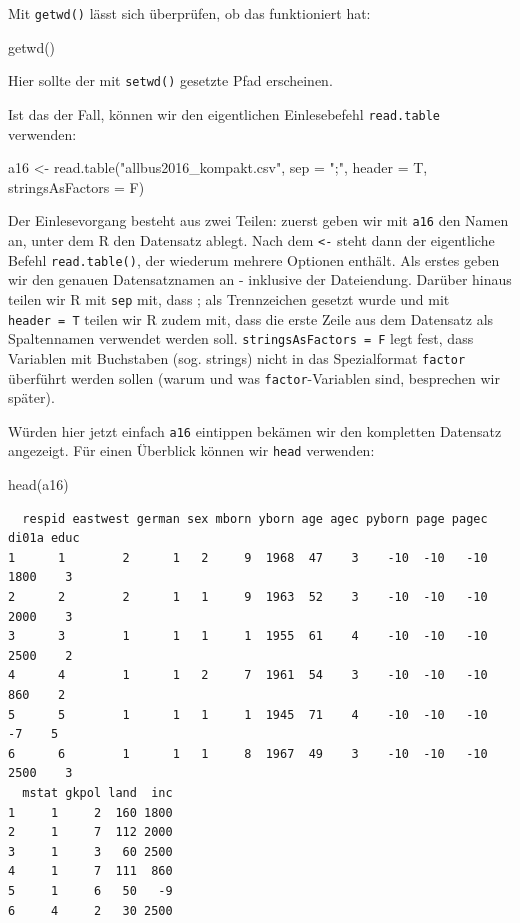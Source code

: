 \documentclass[
  letterpaper,
  DIV=11,
  numbers=noendperiod]{scrreprt}
\newenvironment{Shaded}{\begin{snugshade}}{\end{snugshade}}
\newcommand{\AttributeTok}[1]{\textcolor[rgb]{0.40,0.46,0.14}{#1}}
\newcommand{\FunctionTok}[1]{\textcolor[rgb]{0.28,0.35,0.67}{#1}}
\newcommand{\NormalTok}[1]{\textcolor[rgb]{0.00,0.46,0.62}{#1}}
\newcommand{\OtherTok}[1]{\textcolor[rgb]{0.00,0.46,0.62}{#1}}
\newcommand{\StringTok}[1]{\textcolor[rgb]{0.13,0.47,0.30}{#1}}
\begin{document}
Mit \texttt{getwd()} lässt sich überprüfen, ob das funktioniert hat:

\begin{Shaded}
\begin{Highlighting}[]
\FunctionTok{getwd}\NormalTok{()}
\end{Highlighting}
\end{Shaded}

Hier sollte der mit \texttt{setwd()} gesetzte Pfad erscheinen.

Ist das der Fall, können wir den eigentlichen Einlesebefehl
\texttt{read.table} verwenden:

\begin{Shaded}
\begin{Highlighting}[]
\NormalTok{a16 }\OtherTok{\textless{}{-}} \FunctionTok{read.table}\NormalTok{(}\StringTok{"allbus2016\_kompakt.csv"}\NormalTok{, }\AttributeTok{sep =} \StringTok{";"}\NormalTok{, }\AttributeTok{header =}\NormalTok{ T, }\AttributeTok{stringsAsFactors =}\NormalTok{ F)}
\end{Highlighting}
\end{Shaded}

Der Einlesevorgang besteht aus zwei Teilen: zuerst geben wir mit
\texttt{a16} den Namen an, unter dem R den Datensatz ablegt. Nach dem
\texttt{\textless{}-} steht dann der eigentliche Befehl
\texttt{read.table()}, der wiederum mehrere Optionen enthält. Als erstes
geben wir den genauen Datensatznamen an - inklusive der Dateiendung.
Darüber hinaus teilen wir R mit \texttt{sep} mit, dass ; als
Trennzeichen gesetzt wurde und mit \texttt{header\ =\ T} teilen wir R
zudem mit, dass die erste Zeile aus dem Datensatz als Spaltennamen
verwendet werden soll. \texttt{stringsAsFactors\ =\ F} legt fest, dass
Variablen mit Buchstaben (sog. strings) nicht in das Spezialformat
\texttt{factor} überführt werden sollen (warum und was
\texttt{factor}-Variablen sind, besprechen wir später).

Würden hier jetzt einfach \texttt{a16} eintippen bekämen wir den
kompletten Datensatz angezeigt. Für einen Überblick können wir
\texttt{head} verwenden:

\begin{Shaded}
\begin{Highlighting}[]
\FunctionTok{head}\NormalTok{(a16)}
\end{Highlighting}
\end{Shaded}

\begin{verbatim}
  respid eastwest german sex mborn yborn age agec pyborn page pagec di01a educ
1      1        2      1   2     9  1968  47    3    -10  -10   -10  1800    3
2      2        2      1   1     9  1963  52    3    -10  -10   -10  2000    3
3      3        1      1   1     1  1955  61    4    -10  -10   -10  2500    2
4      4        1      1   2     7  1961  54    3    -10  -10   -10   860    2
5      5        1      1   1     1  1945  71    4    -10  -10   -10    -7    5
6      6        1      1   1     8  1967  49    3    -10  -10   -10  2500    3
  mstat gkpol land  inc
1     1     2  160 1800
2     1     7  112 2000
3     1     3   60 2500
4     1     7  111  860
5     1     6   50   -9
6     4     2   30 2500
\end{verbatim}
\end{document}
